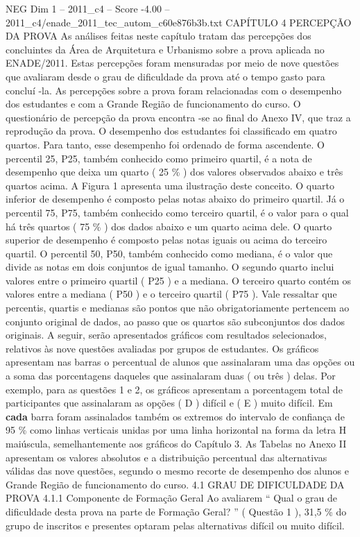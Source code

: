 \begin{textsample}{NEG Dim 1 – 2011\_c4 – Score -4.00 – 2011\_c4/enade\_2011\_tec\_autom\_c60e876b3b.txt}  \label{ex:f1_neg_117}
CAPÍTULO 4 PERCEPÇÃO DA PROVA As análises feitas neste capítulo tratam das percepções dos concluintes da Área de Arquitetura e Urbanismo sobre a prova aplicada no ENADE/2011.
Estas percepções foram mensuradas por meio de nove questões que avaliaram desde o grau de dificuldade da prova até o tempo gasto para concluí -la.
As percepções sobre a prova foram relacionadas com o desempenho dos estudantes e com a Grande Região de funcionamento do curso.
O questionário de percepção da prova encontra -se ao final do Anexo IV, que traz a reprodução da prova.
O desempenho dos estudantes foi classificado em quatro quartos.
Para tanto, esse desempenho foi ordenado de forma ascendente.
O percentil 25, P25, também conhecido como primeiro quartil, é a nota de desempenho que deixa um quarto ( 25 \% ) dos valores observados abaixo e três quartos acima.
A Figura 1 apresenta uma ilustração deste conceito.
O quarto inferior de desempenho é composto pelas notas abaixo do primeiro quartil.
Já o percentil 75, P75, também conhecido como terceiro quartil, é o valor para o qual há três quartos ( 75 \% ) dos dados abaixo e um quarto acima dele.
O quarto superior de desempenho é composto pelas notas iguais ou acima do terceiro quartil.
O percentil 50, P50, também conhecido como mediana, é o valor que divide as notas em dois conjuntos de igual tamanho.
O segundo quarto inclui valores entre o primeiro quartil ( P25 ) e a mediana.
O terceiro quarto contém os valores entre a mediana ( P50 ) e o terceiro quartil ( P75 ).
Vale ressaltar que percentis, quartis e medianas são pontos que não obrigatoriamente pertencem ao conjunto original de dados, ao passo que os quartos são subconjuntos dos dados originais.
A seguir, serão apresentados gráficos com resultados selecionados, relativos às nove questões avaliadas por grupos de estudantes.
Os gráficos apresentam nas barras o percentual de alunos que assinalaram uma das opções ou a soma das porcentagens daqueles que assinalaram duas ( ou três ) delas.
Por exemplo, para as questões 1 e 2, os gráficos apresentam a porcentagem total de participantes que assinalaram as opções ( D ) difícil e ( E ) muito difícil.
Em \textbf{cada} barra foram assinalados também os extremos do intervalo de confiança de 95 \% como linhas verticais unidas por uma linha horizontal na forma da letra H maiúscula, semelhantemente aos gráficos do Capítulo 3.
As Tabelas no Anexo II apresentam os valores absolutos e a distribuição percentual das alternativas válidas das nove questões, segundo o mesmo recorte de desempenho dos alunos e Grande Região de funcionamento do curso. 4.1 GRAU DE DIFICULDADE DA PROVA 4.1.1 Componente de Formação Geral Ao avaliarem “ Qual o grau de dificuldade desta prova na parte de Formação Geral? ” ( Questão 1 ), 31,5 \% do grupo de inscritos e presentes optaram pelas alternativas difícil ou muito difícil.

\end{textsample}
